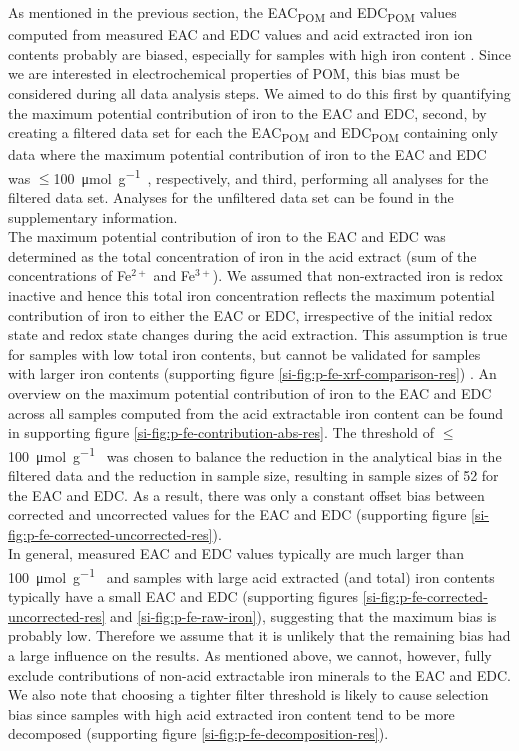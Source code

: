 \documentclass[draft,linenumbers]{agujournal2018}
\begin{document}
As mentioned in the previous section, the EAC\textsubscript{POM} and
EDC\textsubscript{POM} values computed from measured EAC and EDC values
and acid extracted iron ion contents probably are biased, especially for
samples with high iron content \citep{Lau.2015, Lau.2016}. Since we are
interested in electrochemical properties of POM, this bias must be
considered during all data analysis steps. We aimed to do this first by
quantifying the maximum potential contribution of iron to the EAC and
EDC, second, by creating a filtered data set for each the
EAC\textsubscript{POM} and EDC\textsubscript{POM} containing only data
where the maximum potential contribution of iron to the EAC and EDC was
\(\le\)\SI{100}{\micro\mol\per\gram\carbon}, respectively, and third,
performing all analyses for the filtered data set. Analyses for the
unfiltered data set can be found in the supplementary information.\\
The maximum potential contribution of iron to the EAC and EDC was
determined as the total concentration of iron in the acid extract (sum
of the concentrations of Fe\(^{2+}\) and Fe\(^{3+}\)). We assumed that
non-extracted iron is redox inactive and hence this total iron
concentration reflects the maximum potential contribution of iron to
either the EAC or EDC, irrespective of the initial redox state and redox
state changes during the acid extraction. This assumption is true for
samples with low total iron contents, but cannot be validated for
samples with larger iron contents (supporting figure
\ref{si-fig:p-fe-xrf-comparison-res}) \citep{Lau.2016}. An overview on
the maximum potential contribution of iron to the EAC and EDC across all
samples computed from the acid extractable iron content can be found in
supporting figure \ref{si-fig:p-fe-contribution-abs-res}. The threshold
of \(\le\)\SI{100}{\micro\mol\per\gram\carbon} was chosen to balance the
reduction in the analytical bias in the filtered data and the reduction
in sample size, resulting in sample sizes of 52 for the EAC and EDC. As
a result, there was only a constant offset bias between corrected and
uncorrected values for the EAC and EDC (supporting figure
\ref{si-fig:p-fe-corrected-uncorrected-res}).\\
In general, measured EAC and EDC values typically are much larger than
\SI{100}{\micro\mol\per\gram\carbon} and samples with large acid
extracted (and total) iron contents typically have a small EAC and EDC
(supporting figures \ref{si-fig:p-fe-corrected-uncorrected-res} and
\ref{si-fig:p-fe-raw-iron}), suggesting that the maximum bias is
probably low. Therefore we assume that it is unlikely that the remaining
bias had a large influence on the results. As mentioned above, we
cannot, however, fully exclude contributions of non-acid extractable
iron minerals to the EAC and EDC. We also note that choosing a tighter
filter threshold is likely to cause selection bias since samples with
high acid extracted iron content tend to be more decomposed (supporting
figure \ref{si-fig:p-fe-decomposition-res}).
\end{document}
